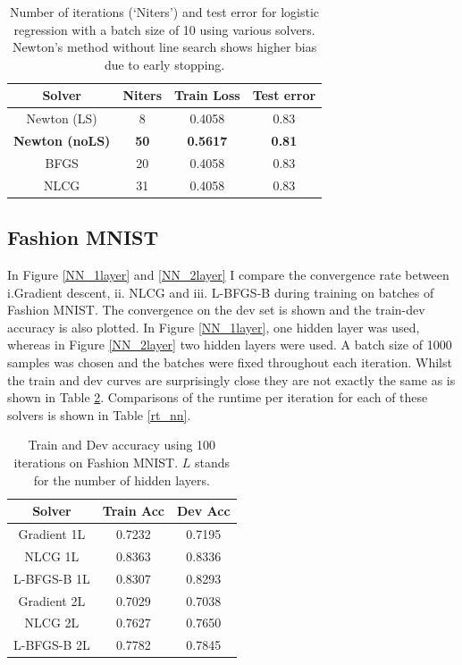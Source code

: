 \documentclass[11pt,twocolumn]{article}
\begin{document}
\begin{table}[h!]
\begin{center}
\begin{tabular}{ cccc} %
\hline
Solver & Niters & Train Loss & Test error  \\ 
\hline 
\hline
Newton (LS) & 8 & 0.4058 & 0.83\\ 
\textbf{Newton (noLS)} & \textbf{50} & \textbf{0.5617} & \textbf{0.81}\\ 
BFGS & 20 & 0.4058 & 0.83\\ 
NLCG & 31 & 0.4058 & 0.83\\ 
\end{tabular}
\end{center}
\caption{Number of iterations (`Niters')  and test error for logistic regression with a batch size of 10 using various solvers. Newton's method without line search shows higher bias due to early stopping.}\label{table_sfixlogreg_testerror}
\end{table}

\subsection{Fashion MNIST} 
In Figure \ref{NN_1layer} and \ref{NN_2layer} I compare the convergence rate between i.Gradient descent,  ii. NLCG and  iii. L-BFGS-B during training on batches of Fashion MNIST. The convergence on the dev set is shown and the train-dev accuracy is also plotted. In Figure \ref{NN_1layer}, one hidden layer was used, whereas in Figure \ref{NN_2layer} two hidden layers were used. A batch size of 1000 samples was chosen and the batches were fixed throughout each iteration. Whilst the train and dev curves are surprisingly close they are not exactly the same as is shown in Table \ref{table_fashion_mnist}. Comparisons of the runtime per iteration for each of these solvers is shown in Table \ref{rt_nn}.

\begin{table}[h!]
\begin{center}
\begin{tabular}{ ccc} %
\hline
Solver & Train Acc & Dev Acc  \\ 
\hline 
\hline
Gradient 1L & 0.7232 & 0.7195\\ 
NLCG 1L& 0.8363 & 0.8336\\ 
L-BFGS-B 1L& 0.8307 & 0.8293\\ 
Gradient 2L & 0.7029 & 0.7038\\ 
NLCG 2L& 0.7627 & 0.7650\\ 
L-BFGS-B 2L& 0.7782 & 0.7845\\ 
\end{tabular}
\end{center}
\caption{Train and Dev accuracy using 100 iterations on Fashion MNIST. $L$ stands for the number of hidden layers.}\label{table_fashion_mnist}
\end{table}
\end{document}

